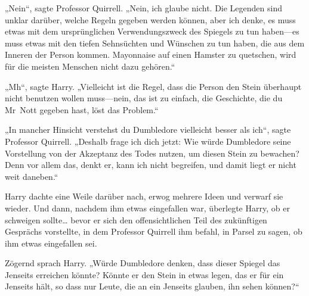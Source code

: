 „Nein“, sagte Professor Quirrell. „Nein, ich glaube nicht. Die Legenden sind unklar darüber, welche Regeln gegeben werden können, aber ich denke, es muss etwas mit dem ursprünglichen Verwendungszweck des Spiegels zu tun haben—es muss etwas mit den tiefen Sehnsüchten und Wünschen zu tun haben, die aus dem Inneren der Person kommen. Mayonnaise auf einen Hamster zu quetschen, wird für die meisten Menschen nicht dazu gehören.“

„Mh“, sagte Harry. „Vielleicht ist die Regel, dass die Person den Stein überhaupt nicht benutzen wollen muss—nein, das ist zu einfach, die Geschichte, die du Mr~Nott gegeben hast, löst das Problem.“

„In mancher Hinsicht verstehst du Dumbledore vielleicht besser als ich“, sagte Professor Quirrell. „Deshalb frage ich dich jetzt: Wie würde Dumbledore seine Vorstellung von der Akzeptanz des Todes nutzen, um diesen Stein zu bewachen? Denn vor allem das, denkt er, kann ich nicht begreifen, und damit liegt er nicht weit daneben.“

Harry dachte eine Weile darüber nach, erwog mehrere Ideen und verwarf sie wieder. Und dann, nachdem ihm etwas eingefallen war, überlegte Harry, ob er schweigen sollte… bevor er sich den offensichtlichen Teil des zukünftigen Gesprächs vorstellte, in dem Professor Quirrell ihm befahl, in Parsel zu sagen, ob ihm etwas eingefallen sei.

Zögernd sprach Harry. „Würde Dumbledore denken, dass dieser Spiegel das Jenseits erreichen könnte? Könnte er den Stein in etwas legen, das er für ein Jenseits hält, so dass nur Leute, die an ein Jenseits glauben, ihn sehen können?“

